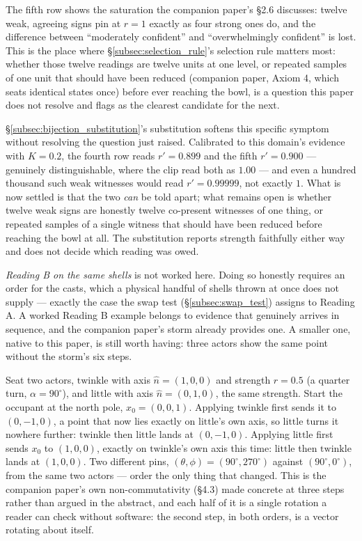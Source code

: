 \documentclass[12pt, a4paper]{article}
\begin{document}
The fifth row shows the saturation the companion paper's \S2.6 discusses: twelve weak, agreeing signs pin at $r=1$ exactly as four
strong ones do, and the difference between ``moderately confident''
and ``overwhelmingly confident'' is lost. This is the place where
\S\ref{subsec:selection_rule}'s selection rule matters most: whether
those twelve readings are twelve units at one level, or repeated
samples of one unit that should have been reduced (companion paper, Axiom 4, which seats identical states once) before ever reaching the bowl, is a question this paper does
not resolve and flags as the clearest candidate for the next.

\S\ref{subsec:bijection_substitution}'s substitution softens this
specific symptom without resolving the question just raised.
Calibrated to this domain's evidence with $K=0.2$, the fourth row
reads $r'=0.899$ and the fifth $r'=0.900$ --- genuinely
distinguishable, where the clip read both as $1.00$ --- and even a
hundred thousand such weak witnesses would read $r'=0.99999$, not
exactly $1$. What is now settled is that the two \emph{can} be told
apart; what remains open is whether twelve weak signs are honestly
twelve co-present witnesses of one thing, or repeated samples of a
single witness that should have been reduced before reaching the bowl
at all. The substitution reports strength faithfully either way and
does not decide which reading was owed.

\emph{Reading B on the same shells} is not worked here. Doing so
honestly requires an order for the casts, which a physical handful of
shells thrown at once does not supply --- exactly the case the swap
test (\S\ref{subsec:swap_test}) assigns to Reading A. A worked Reading
B example belongs to evidence that genuinely arrives in sequence, and
the companion paper's storm already provides one. A smaller one,
native to this paper, is still worth having: three actors show the
same point without the storm's six steps.

Seat two actors, $\mathrm{twinkle}$ with axis $\hat n=(1,0,0)$ and
strength $r=0.5$ (a quarter turn, $\alpha=90^\circ$), and
$\mathrm{little}$ with axis $\hat n=(0,1,0)$, the same strength.
Start the occupant at the north pole, $x_0=(0,0,1)$. Applying
$\mathrm{twinkle}$ first sends it to $(0,-1,0)$, a point that now
lies exactly on $\mathrm{little}$'s own axis, so $\mathrm{little}$
turns it nowhere further: $\mathrm{twinkle}$ then $\mathrm{little}$
lands at $(0,-1,0)$. Applying $\mathrm{little}$ first sends $x_0$ to
$(1,0,0)$, exactly on $\mathrm{twinkle}$'s own axis this time:
$\mathrm{little}$ then $\mathrm{twinkle}$ lands at $(1,0,0)$. Two
different pins, $(\theta,\phi)=(90^\circ,270^\circ)$ against
$(90^\circ,0^\circ)$, from the same two actors --- order the only
thing that changed. This is the companion paper's own
non-commutativity (\S4.3) made concrete at three steps rather than
argued in the abstract, and each half of it is a single rotation a
reader can check without software: the second step, in both orders,
is a vector rotating about itself.
\end{document}
